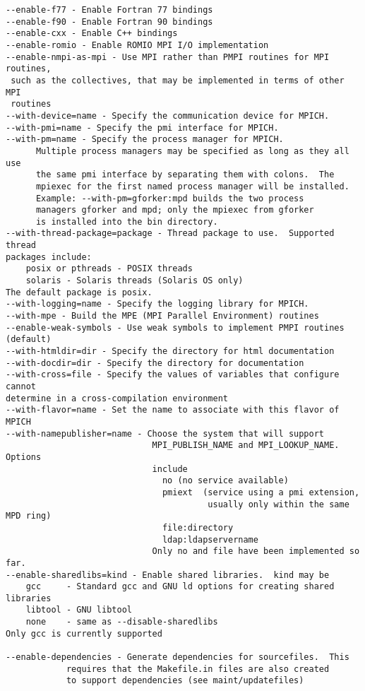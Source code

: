 \documentclass[dvipdfm,11pt]{article}
\begin{document}
\begin{small}
\begin{verbatim}
--enable-f77 - Enable Fortran 77 bindings
--enable-f90 - Enable Fortran 90 bindings
--enable-cxx - Enable C++ bindings
--enable-romio - Enable ROMIO MPI I/O implementation
--enable-nmpi-as-mpi - Use MPI rather than PMPI routines for MPI routines,
 such as the collectives, that may be implemented in terms of other MPI 
 routines
--with-device=name - Specify the communication device for MPICH.
--with-pmi=name - Specify the pmi interface for MPICH.
--with-pm=name - Specify the process manager for MPICH.
      Multiple process managers may be specified as long as they all use
      the same pmi interface by separating them with colons.  The 
      mpiexec for the first named process manager will be installed.
      Example: --with-pm=gforker:mpd builds the two process 
      managers gforker and mpd; only the mpiexec from gforker
      is installed into the bin directory.
--with-thread-package=package - Thread package to use.  Supported thread
packages include:
    posix or pthreads - POSIX threads
    solaris - Solaris threads (Solaris OS only)
The default package is posix.
--with-logging=name - Specify the logging library for MPICH.
--with-mpe - Build the MPE (MPI Parallel Environment) routines
--enable-weak-symbols - Use weak symbols to implement PMPI routines (default)
--with-htmldir=dir - Specify the directory for html documentation
--with-docdir=dir - Specify the directory for documentation
--with-cross=file - Specify the values of variables that configure cannot
determine in a cross-compilation environment
--with-flavor=name - Set the name to associate with this flavor of MPICH
--with-namepublisher=name - Choose the system that will support 
                             MPI_PUBLISH_NAME and MPI_LOOKUP_NAME.  Options
                             include
                               no (no service available)
                               pmiext  (service using a pmi extension,
                                        usually only within the same MPD ring)
                               file:directory
                               ldap:ldapservername
                             Only no and file have been implemented so far.
--enable-sharedlibs=kind - Enable shared libraries.  kind may be
    gcc     - Standard gcc and GNU ld options for creating shared libraries
    libtool - GNU libtool 
    none    - same as --disable-sharedlibs
Only gcc is currently supported

--enable-dependencies - Generate dependencies for sourcefiles.  This
            requires that the Makefile.in files are also created
            to support dependencies (see maint/updatefiles)
\end{verbatim}
\end{small}
\end{document}
